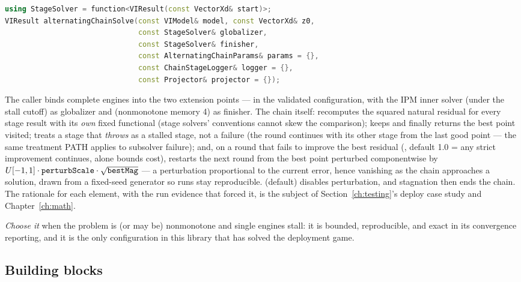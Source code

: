 \begin{lstlisting}[language=C++]
using StageSolver = function<VIResult(const VectorXd& start)>;
VIResult alternatingChainSolve(const VIModel& model, const VectorXd& z0,
                               const StageSolver& globalizer,
                               const StageSolver& finisher,
                               const AlternatingChainParams& params = {},
                               const ChainStageLogger& logger = {},
                               const Projector& projector = {});
\end{lstlisting}

The caller binds complete engines into the two  extension
points --- in the validated configuration,  with the IPM
inner solver (under the stall cutoff) as globalizer and
 (nonmonotone memory 4) as finisher. The chain
itself: recomputes the squared natural residual for every stage result with
its \emph{own} fixed functional (stage solvers' conventions cannot skew the
comparison); keeps and finally returns the best point visited; treats a
stage that \emph{throws} as a stalled stage, not a failure (the round
continues with its other stage from the last good point --- the same
treatment PATH applies to subsolver failure); and, on a round that fails to
improve the best residual (, default 1.0 = any strict
improvement continues,  alone bounds cost), restarts the
next round from the best point perturbed componentwise by
$U[-1,1] \cdot \texttt{perturbScale} \cdot \sqrt{\texttt{bestMag}}$ --- a
perturbation proportional to the current error, hence vanishing as the
chain approaches a solution, drawn from a fixed-seed generator so runs stay
reproducible.  (default) disables perturbation, and
stagnation then ends the chain. The rationale for each element, with the
run evidence that forced it, is the subject of Section~\ref{ch:testing}'s
deploy case study and Chapter~\ref{ch:math}.

\emph{Choose it} when the problem is (or may be) nonmonotone and single
engines stall: it is bounded, reproducible, and exact in its convergence
reporting, and it is the only configuration in this library that has solved
the deployment game.

\subsection{Building blocks}
\label{sec:blocks}

